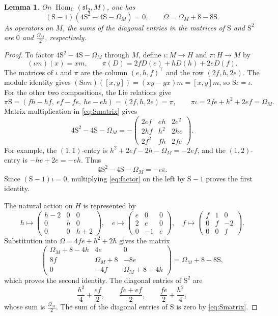 \documentclass[11pt,reqno]{amsart}
\numberwithin{equation}{section}
\newcommand{\C}{\mathbb C}
\newcommand{\s}{\mathfrak{sl}_2}
\DeclareMathOperator{\Hom}{Hom}
\newtheorem{lemma}[theorem]{Lemma}
\theoremstyle{definition}
\theoremstyle{remark}
\begin{document}
\begin{lemma}\label{lem:casimir}
On \(\Hom_\C(\s,M)\), one has
\begin{equation}\label{eq:operator-identities}
(\mathrm{S}-1)(4\mathrm{S}^2-4\mathrm{S}-\Omega_M)=0,\qquad \Omega=\Omega_M+8-8\mathrm{S}.
\end{equation}
As operators on \(M\), the sums of the diagonal entries in
the matrices of \(\mathrm{S}\) and \(\mathrm{S}^2\) are \(0\) and
\(\frac{\Omega_M}{2}\), respectively.
\end{lemma}
\begin{proof}
To factor \(4\mathrm{S}^2-4\mathrm{S}-\Omega_M\) through \(M\), define
\(\iota:M\to H\) and \(\pi:H\to M\) by
\[
(\iota m)(x)=xm,\qquad
\pi(D)=2fD(e)+hD(h)+2eD(f).
\]
The matrices of \(\iota\) and \(\pi\) are the column
\((e,h,f)^{\top}\) and the row \((2f,h,2e)\).
The module identity gives
\((\mathrm{S}\iota m)([x,y])=(xy-yx)m=[x,y]m\), so \(\mathrm{S}\iota=\iota\).
For the other two compositions, the Lie relations give
\[
\pi \mathrm{S}=(fh-hf,\ ef-fe,\ he-eh)=(2f,h,2e)=\pi,
\qquad \pi\iota=2fe+h^2+2ef=\Omega_M.
\]
Matrix multiplication in \eqref{eq:Smatrix} gives
\[
4\mathrm{S}^2-4\mathrm{S}-\Omega_M=
-\begin{pmatrix}
2ef&eh&2e^2\\
2hf&h^2&2he\\
2f^2&fh&2fe
\end{pmatrix}.
\]
For example, the \((1,1)\)-entry is
\(h^2+2ef-2h-\Omega_M=-2ef\), and the \((1,2)\)-entry
is \(-he+2e=-eh\). Thus
\begin{equation}\label{eq:factor}
4\mathrm{S}^2-4\mathrm{S}-\Omega_M=-\iota\pi.
\end{equation}
Since \((\mathrm{S}-1)\iota=0\), multiplying
\eqref{eq:factor} on the left by \(\mathrm{S}-1\) proves the first identity.

The natural action on \(H\) is represented by
\[
h\mapsto\begin{pmatrix}h-2&0&0\\0&h&0\\0&0&h+2\end{pmatrix},\quad
e\mapsto\begin{pmatrix}e&0&0\\2&e&0\\0&-1&e\end{pmatrix},\quad
f\mapsto\begin{pmatrix}f&1&0\\0&f&-2\\0&0&f\end{pmatrix}.
\]
Substitution into \(\Omega=4fe+h^2+2h\) gives the matrix
\[
\begin{pmatrix}
\Omega_M+8-4h&4e&0\\
8f&\Omega_M+8&-8e\\
0&-4f&\Omega_M+8+4h
\end{pmatrix}
=\Omega_M+8-8\mathrm{S},
\]
which proves the second identity. The diagonal entries of \(\mathrm{S}^2\) are
\[
\frac{h^2}{4}+\frac{ef}{2},\qquad \frac{fe+ef}{2},\qquad \frac{fe}{2}+\frac{h^2}{4},
\]
whose sum is \(\frac{\Omega_M}{2}\). The sum of the diagonal entries
of \(\mathrm{S}\) is zero by \eqref{eq:Smatrix}.
\end{proof}
\end{document}
